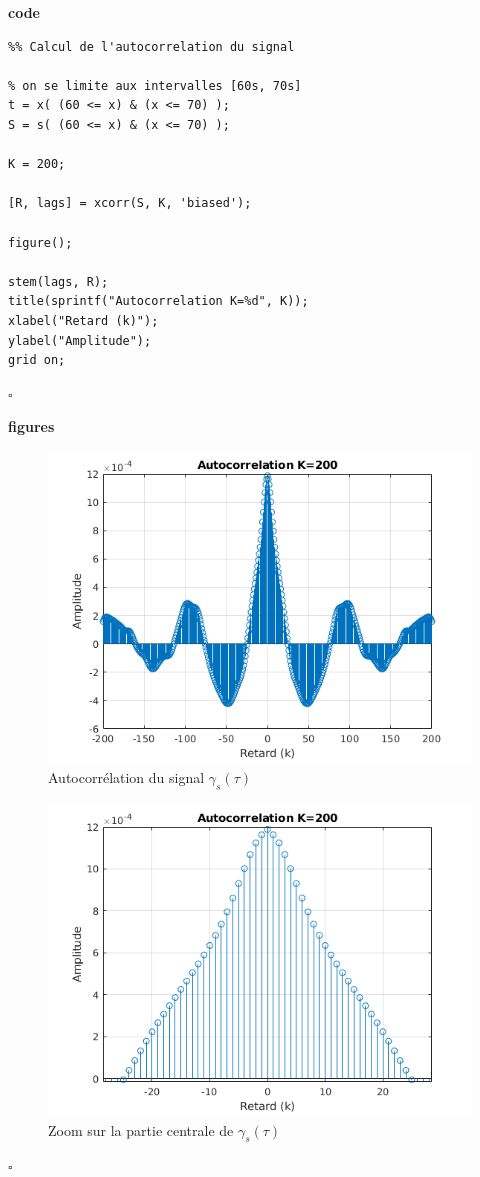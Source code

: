 \documentclass{article}
\newcommand{\debutrep}[1]{\color{blue}\begin{center} \hrulefill \textbf{ #1 } \hrulefill \end{center} }
\newcommand{\finrep}{\vspace*{5mm}\hfill $\square$\color{black}\vspace*{5mm}}
\begin{document}
\debutrep{code}
\begin{verbatim}
%% Calcul de l'autocorrelation du signal

% on se limite aux intervalles [60s, 70s]
t = x( (60 <= x) & (x <= 70) );
S = s( (60 <= x) & (x <= 70) );

K = 200;

[R, lags] = xcorr(S, K, 'biased');

figure();

stem(lags, R);
title(sprintf("Autocorrelation K=%d", K));
xlabel("Retard (k)");
ylabel("Amplitude");
grid on;
\end{verbatim}
\finrep

\debutrep{figures}
\begin{figure}[H]
    \includegraphics[width=0.9\columnwidth]{xcorr.png}
    \caption{Autocorrélation du signal $\gamma_s(\tau)$}
\end{figure}
\begin{figure}[H]
    \includegraphics[width=0.9\columnwidth]{xcorr-zoom.png}
    \caption{Zoom sur la partie centrale de $\gamma_s(\tau)$}
\end{figure}
\finrep
\end{document}
